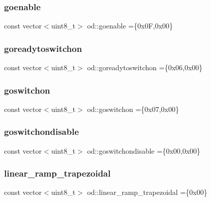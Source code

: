 \mbox{\label{namespaceod_a74448ee88df5960df4c32613e7cdcd53}} 
\subsubsection{\texorpdfstring{goenable}{goenable}}
{\footnotesize\ttfamily const vector$<$uint8\+\_\+t$>$ od\+::goenable =\{0x0\+F,0x00\}}

\mbox{\label{namespaceod_a360cf2eae7cc59f7bd224fcf5992c767}} 
\subsubsection{\texorpdfstring{goreadytoswitchon}{goreadytoswitchon}}
{\footnotesize\ttfamily const vector$<$uint8\+\_\+t$>$ od\+::goreadytoswitchon =\{0x06,0x00\}}

\mbox{\label{namespaceod_a933f995790a17f6cdd3b54df8f7483a6}} 
\subsubsection{\texorpdfstring{goswitchon}{goswitchon}}
{\footnotesize\ttfamily const vector$<$uint8\+\_\+t$>$ od\+::goswitchon =\{0x07,0x00\}}

\mbox{\label{namespaceod_a12f3001ff096334fecb9c9749be4d1c2}} 
\subsubsection{\texorpdfstring{goswitchondisable}{goswitchondisable}}
{\footnotesize\ttfamily const vector$<$uint8\+\_\+t$>$ od\+::goswitchondisable =\{0x00,0x00\}}

\mbox{\label{namespaceod_a8d1e6a3e8180e5d64d68588ee182721c}} 
\subsubsection{\texorpdfstring{linear\+\_\+ramp\+\_\+trapezoidal}{linear\_ramp\_trapezoidal}}
{\footnotesize\ttfamily const vector$<$uint8\+\_\+t$>$ od\+::linear\+\_\+ramp\+\_\+trapezoidal =\{0x00\}}

